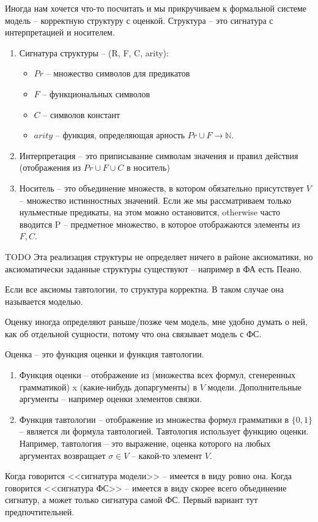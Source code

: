 Иногда нам хочется что-то посчитать и мы прикручиваем к
формальной системе модель -- корректную структуру с оценкой.
Структура -- это сигнатура с интерпретацией и носителем.
\begin{enumerate}
\item Сигнатура структуры -- (R, F, C, arity):
\begin{itemize}
\item $Pr$ -- множество символов для предикатов
\item $F$ -- функциональных символов
\item $C$ -- символов констант
\item $arity$ – функция, определяющая арность $Pr \cup F \to \mathbb N$.
\end{itemize}
\item Интерпретация -- это приписывание символам значения
и правил действия (отображения из $Pr \cup F \cup C$ в носитель)
\item Носитель -- это объединение множеств, в котором обязательно
присутствует $V$ -- множество истинностных значений. Если же
мы рассматриваем только нульместные предикаты, на этом
можно остановится, otherwise часто вводится P -- предметное
множество, в которое отображаются элементы из $F, C$.
\end{enumerate}
TODO Эта реализация структуры не определяет ничего в районе
аксиоматики, но аксиоматически заданные структуры существуют
– например в ФА есть Пеано.

Если все аксиомы тавтологии, то структура корректна.
В таком случае она называется моделью.

Оценку иногда определяют раньше/позже чем модель, мне
удобно думать о ней, как об отдельной сущности, потому что
она связывает модель с ФС.

Оценка -- это функция оценки и функция тавтологии.
\begin{enumerate}
\item Функция оценки -- отображение из (множества всех формул,
сгенеренных грамматикой) x (какие-нибудь допаргументы)
в $V$ модели. Дополнительные аргументы -- например оценки
элементов связки.
\item Функция тавтологии -- отображение из множества формул
грамматики в $\{0, 1\}$ -- является ли формула тавтологией.
Тавтология использует функцию оценки. Например, тавтология
-- это выражение, оценка которого на любых аргументах
возвращает $\sigma \in V$ -- какой-то элемент $V$.
\end{enumerate}

Когда говорится <<сигнатура модели>> -- имеется в виду ровно она.
Когда говорится <<сигнатура ФС>> -- имеется в виду скорее всего
объединение сигнатур, а может только сигнатура самой ФС. Первый
вариант тут предпочтительней.
